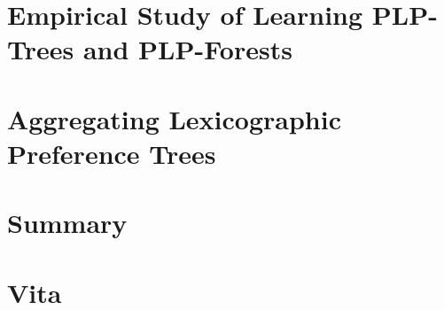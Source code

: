 \documentclass[final]{ukthesis}
\begin{document}
\chapter{Empirical Study of Learning PLP-Trees and PLP-Forests\label{ch:PLPTF}}

\copyrightnotice

\chapter{Aggregating Lexicographic Preference Trees\label{ch:aggLP}}

\copyrightnotice

%

\chapter{Summary\label{ch:summary}}

\copyrightnotice


\backmatter



\chapter{Vita}

\copyrightnotice
\end{document}
